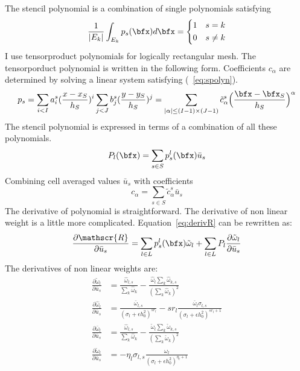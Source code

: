 The stencil polynomial is a combination of single polynomials satisfying 
\begin{equation}\label{eq:spolyn}
		  \frac{1}{|E_k|} \int_{E_k} p_s(\bfx) d\bfx = \left \{ 
		  \begin{aligned}
					 &1 \quad s=k\\
					 &0 \quad s\neq k
		  \end{aligned}\right .
\end{equation}
I use tensorproduct polynomials for logically rectangular mesh.
The tensorporduct polynomial is written in the following form.
Coefficients $c_{\alpha}$ are determined by solving a linear
system satisfying (~\ref{eq:spolyn}).
\begin{equation}\label{eq:tensorProductPolyn}
		  p_s = \sum_{i < I} a^s_i (\frac{x-x_S}{h_S})^i \sum_{j < J} b^s_j (\frac{y-y_S}{h_S})^j = 
		  \sum_{\substack{\mid \alpha \mid \leq (I-1)\times (J-1)}} \tilde c^s_{\alpha} \Big(\frac{\bfx - \bfx_S}{h_S}\Big)^\alpha
\end{equation}
The stencil polynomial is expressed in terms of a 
combination of all these polynomials.
\begin{equation}\label{eq:Spolyn}
		  P_l(\bfx) = \sum_{s\in S} p^l_s(\bfx) \bar u_s
\end{equation}
Combining cell averaged values $\bar u_s$ with coefficients
\begin{equation}\label{eq:c_alpha}
		  c_{\alpha} = \sum_{s\in S} \tilde c^s_{\alpha} \bar u_s
\end{equation}
The derivative of polynomial is straightforward. The derivative of non linear weight is 
a little more complicated. Equation~\ref{eq:derivR} can be rewritten as:
\begin{equation}\label{eq:derivR_detail}
		  \frac{\partial \mathscr{R}}{\partial \bar u_s} = \sum_{l \in L} p^l_s(\bfx) \tilde \omega_l + 
		  \sum_{l\in L} P_l\frac{\partial \tilde \omega_l}{\partial \bar u_s}
\end{equation}
The derivatives of non linear weights are:
\begin{equation}\label{eq:derivNonlinearWgt}
		  \begin{aligned}
					 \frac{\partial \tilde \omega_l}{\partial \bar u_s} &= \frac{\hat \omega_{l,s}}{\sum_k \hat \omega_k} - 
		  \frac{\hat \omega_{l}\sum_k \hat \omega_{k,s}}{(\sum_k \hat \omega_{k})^2}\\
					 \frac{\partial \hat \omega_l}{\partial \bar u_s} &= \frac{\bar \omega_{l,s}}{(\sigma_l + \epsilon h_0^2)^{sr_l}} -
					 sr_l \frac{\bar \omega_l \sigma_{l,s}}{(\sigma_l + \epsilon h_0^2)^{sr_l+1}}\\
					 \frac{\partial \bar \omega_l}{\partial \bar u_s} &= \frac{\hat \omega_{l,s}}{\sum_k \hat \omega_k} - 
		  \frac{\check \omega_{l}\sum_k \check \omega_{k,s}}{(\sum_k \check \omega_{k})^2}\\
					 \frac{\partial \check \omega_l}{\partial \bar u_s} &= -\eta_l\sigma_{l,s}
					 \frac{\omega_l}{(\sigma_l + \epsilon h_0^2)^{\eta_l+1}}
		  \end{aligned}
\end{equation}
